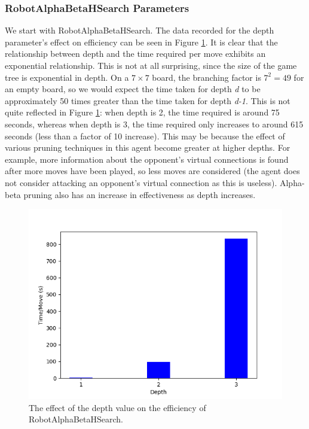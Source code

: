 \subsubsection{RobotAlphaBetaHSearch Parameters}
We start with RobotAlphaBetaHSearch. The data recorded for the depth parameter's effect on efficiency can be seen in Figure \ref{fig:hsearch_depth_time}. It is clear that the relationship between depth and the time required per move exhibits an exponential relationship. This is not at all surprising, since the size of the game tree is exponential in depth. On a $7\times 7$ board, the branching factor is $7^2 = 49$ for an empty board, so we would expect the time taken for depth \textit{d} to be approximately 50 times greater than the time taken for depth \textit{d-1}. This is not quite reflected in Figure \ref{fig:hsearch_depth_time}: when depth is 2, the time required is around 75 seconds, whereas when depth is 3, the time required only increases to around 615 seconds (less than a factor of 10 increase). This may be because the effect of various pruning techniques in this agent become greater at higher depths. For example, more information about the opponent's virtual connections is found after more moves have been played, so less moves are considered (the agent does not consider attacking an opponent's virtual connection as this is useless). Alpha-beta pruning also has an increase in effectiveness as depth increases.

\begin{figure}
    \centering
    \includegraphics[scale = 0.6]{images/HSEARCHDEPTH_TIME_INF.png}
    \caption{The effect of the depth value on the efficiency of RobotAlphaBetaHSearch.}
    \label{fig:hsearch_depth_time}
\end{figure}













